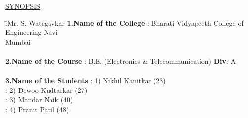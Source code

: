 \documentclass[12pt]{article}
\begin{document}
	\begin{center}
		\LARGE{\underline{SYNOPSIS}}\\
	\end{center}
	
	\begin{tabbing}
		\hspace*{2 in}    \= :Mr. S. Wategavkar    \kill
		\textbf{1.Name of the College} \> : Bharati  Vidyapeeth College of Engineering Navi \\
		\textbf{} \> \hspace{0.18cm} Mumbai \\
		\\
		\textbf{2.Name of the Course}\>  : B.E. (Electronics \& Telecommunication) \textbf{Div}: A \\
		\\
		\textbf{3.Name of the Students}\>  : 1) Nikhil Kanitkar (23)\\
		\textbf{}\>: 2) Dewoo Kudtarkar (27)\\
		\textbf{}\>: 3) Mandar Naik (40)\\
		\textbf{}\>: 4) Pranit Patil (48)\\
		\\
		

\end{tabbing}
\end{document}
